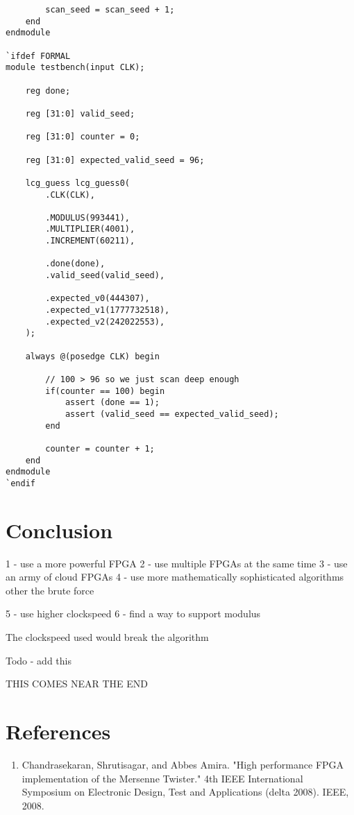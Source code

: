 \documentclass{article}
\begin{document}
\begin{lstlisting}
        scan_seed = scan_seed + 1;
    end
endmodule

`ifdef FORMAL
module testbench(input CLK);
    
    reg done;
    
    reg [31:0] valid_seed;
    
    reg [31:0] counter = 0;
    
    reg [31:0] expected_valid_seed = 96;
    
    lcg_guess lcg_guess0(
        .CLK(CLK),
        
        .MODULUS(993441),
        .MULTIPLIER(4001),
        .INCREMENT(60211),
        
        .done(done),
        .valid_seed(valid_seed),
        
        .expected_v0(444307),
        .expected_v1(1777732518),
        .expected_v2(242022553),
    );
    
    always @(posedge CLK) begin
        
        // 100 > 96 so we just scan deep enough
        if(counter == 100) begin
            assert (done == 1); 
            assert (valid_seed == expected_valid_seed); 
        end
        
        counter = counter + 1;
    end
endmodule
`endif
    \end{lstlisting}   

    \section{Conclusion}

    1 - use a more powerful FPGA
    2 - use multiple FPGAs at the same time
    3 - use an army of cloud FPGAs
    4 - use more mathematically sophisticated algorithms other the brute force

    5 - use higher clockspeed
    6 - find a way to support modulus 

    The clockspeed used would break the algorithm

    Todo - add this

    THIS COMES NEAR THE END

    \break
    \section*{References}

    \begin{enumerate}

    \item Chandrasekaran, Shrutisagar, and Abbes Amira. "High performance FPGA implementation of the Mersenne Twister." 4th IEEE International Symposium on Electronic Design, Test and Applications (delta 2008). IEEE, 2008.

    \end{enumerate}
    
\end{document}
